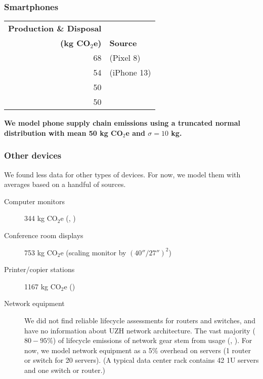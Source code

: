 \documentclass[11pt]{article}
\newcommand{\assumption}[1]{{\bf #1}}
\begin{document}
\subsubsection{Smartphones}

\begin{center}
\begin{tabular}{|r|l|}
\hline
\textbf{Production \& Disposal} & \\
\textbf{(kg CO$_2$e)} & \textbf{Source} \\ \hline
68 & \textcite{googlepixel8} (Pixel 8)\\ \hline
54 & \textcite{appleiphone13} (iPhone 13)\\ \hline
50 & \textcite{unctadder2024} \\ \hline
50 & \textcite{lovehagen2023} \\ \hline
\end{tabular}
\label{tab:embodied_emissions:phones}
\end{center}

\assumption{We model phone supply chain emissions using a truncated normal distribution with mean
50 kg CO$_2$e and $\sigma = 10$ kg.}

\subsubsection{Other devices}

We found less data for other types of devices. For now, we model them with averages based
on a handful of sources.

\begin{description}
    \item[Computer monitors] 344 kg CO$_2$e (\textcite{teehan2013}, \textcite{dellpcf})
    \item[Conference room displays] 753 kg CO$_2$e (scaling monitor by $(40''/27'')^2$)
    \item[Printer/copier stations] 1167 kg CO$_2$e (\textcite{ecoinvent})
    \item[Network equipment] We did not find reliable lifecycle assessments for routers and switches,
      and have no information about UZH network architecture. The vast majority ($80-95\%$) of
      lifecycle emissions of network gear stem from usage (\textcite{cisco2024}, \textcite{jacob2023}).
      For now, we model network equipment as a 5\% overhead on servers (1 router or switch for 20 servers).
      (A typical data center rack contains 42 1U servers and one switch or router.)
\end{description}
\end{document}
